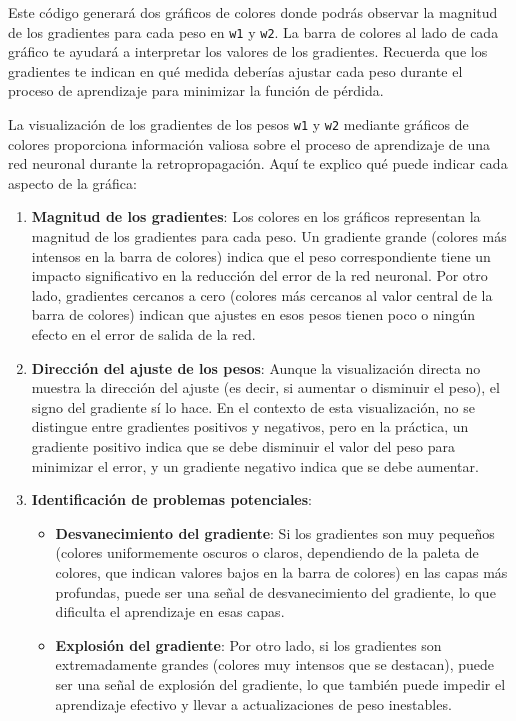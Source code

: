 \documentclass[11pt]{article}
\begin{document}
Este código generará dos gráficos de colores donde podrás observar la
magnitud de los gradientes para cada peso en \texttt{w1} y \texttt{w2}. La barra de
colores al lado de cada gráfico te ayudará a interpretar los valores de
los gradientes. Recuerda que los gradientes te indican en qué medida
deberías ajustar cada peso durante el proceso de aprendizaje para
minimizar la función de pérdida.

La visualización de los gradientes de los pesos \texttt{w1} y \texttt{w2} mediante
gráficos de colores proporciona información valiosa sobre el proceso de
aprendizaje de una red neuronal durante la retropropagación. Aquí te
explico qué puede indicar cada aspecto de la gráfica:

\begin{enumerate}
\item \textbf{Magnitud de los gradientes}: Los colores en los gráficos representan
la magnitud de los gradientes para cada peso. Un gradiente grande
(colores más intensos en la barra de colores) indica que el peso
correspondiente tiene un impacto significativo en la reducción del
error de la red neuronal. Por otro lado, gradientes cercanos a cero
(colores más cercanos al valor central de la barra de colores)
indican que ajustes en esos pesos tienen poco o ningún efecto en el
error de salida de la red.

\item \textbf{Dirección del ajuste de los pesos}: Aunque la visualización directa
no muestra la dirección del ajuste (es decir, si aumentar o disminuir
el peso), el signo del gradiente sí lo hace. En el contexto de esta
visualización, no se distingue entre gradientes positivos y
negativos, pero en la práctica, un gradiente positivo indica que se
debe disminuir el valor del peso para minimizar el error, y un
gradiente negativo indica que se debe aumentar.

\item \textbf{Identificación de problemas potenciales}:

\begin{itemize}
\item \textbf{Desvanecimiento del gradiente}: Si los gradientes son muy pequeños
(colores uniformemente oscuros o claros, dependiendo de la paleta
de colores, que indican valores bajos en la barra de colores) en
las capas más profundas, puede ser una señal de desvanecimiento del
gradiente, lo que dificulta el aprendizaje en esas capas.
\item \textbf{Explosión del gradiente}: Por otro lado, si los gradientes son
extremadamente grandes (colores muy intensos que se destacan),
puede ser una señal de explosión del gradiente, lo que también
puede impedir el aprendizaje efectivo y llevar a actualizaciones de
peso inestables.
\end{itemize}


\end{enumerate}
\end{document}
